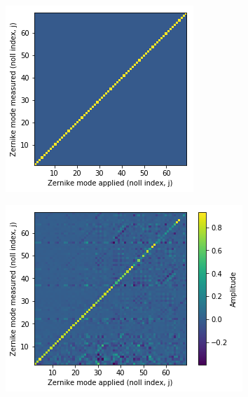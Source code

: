\begin{figure}[h]
	\centering
	\begin{subfigure}{0.45\textwidth}
		\centering
		\includegraphics[width=0.8\linewidth, scale=0.5]{./images/characterisation_assay_ideal.png}
		\caption{}
		\label{fig:characterisation_assay_ideal}
	\end{subfigure}
	\begin{subfigure}{0.45\textwidth}
		\centering
		\includegraphics[width=1\linewidth, scale=0.5]{./images/characterisation_assay_real.png}
		\caption{}
		\label{fig:characterisation_assay_real}
	\end{subfigure}

\end{figure}
